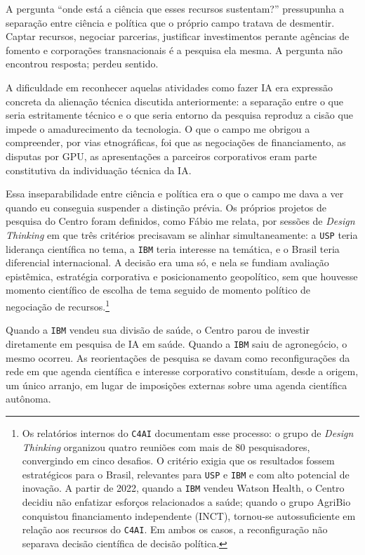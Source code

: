 A pergunta \enquote{onde está a ciência que esses recursos sustentam?} pressupunha a separação entre ciência e política que o próprio campo tratava de desmentir. Captar recursos, negociar parcerias, justificar investimentos perante agências de fomento e corporações transnacionais é a pesquisa ela mesma. A pergunta não encontrou resposta; perdeu sentido.

A dificuldade em reconhecer aquelas atividades como fazer IA era expressão concreta da alienação técnica discutida anteriormente: a separação entre o que seria estritamente técnico e o que seria entorno da pesquisa reproduz a cisão que impede o amadurecimento da tecnologia. O que o campo me obrigou a compreender, por vias etnográficas, foi que as negociações de financiamento, as disputas por GPU, as apresentações a parceiros corporativos eram parte constitutiva da individuação técnica da IA.

Essa inseparabilidade entre ciência e política era o que o campo me dava a ver quando eu conseguia suspender a distinção prévia. Os próprios projetos de pesquisa do Centro foram definidos, como Fábio me relata, por sessões de \textit{Design Thinking} em que três critérios precisavam se alinhar simultaneamente: a \texttt{USP} teria liderança científica no tema, a \texttt{IBM} teria interesse na temática, e o Brasil teria diferencial internacional. A decisão era uma só, e nela se fundiam avaliação epistêmica, estratégia corporativa e posicionamento geopolítico, sem que houvesse momento científico de escolha de tema seguido de momento político de negociação de recursos.\footnote{Os relatórios internos do \texttt{C4AI} documentam esse processo: o grupo de \textit{Design Thinking} organizou quatro reuniões com mais de 80 pesquisadores, convergindo em cinco desafios. O critério exigia que os resultados fossem estratégicos para o Brasil, relevantes para \texttt{USP} e \texttt{IBM} e com alto potencial de inovação. A partir de 2022, quando a \texttt{IBM} vendeu Watson Health, o Centro decidiu não enfatizar esforços relacionados a saúde; quando o grupo AgriBio conquistou financiamento independente (INCT), tornou-se autossuficiente em relação aos recursos do \texttt{C4AI}. Em ambos os casos, a reconfiguração não separava decisão científica de decisão política.}

Quando a \texttt{IBM} vendeu sua divisão de saúde, o Centro parou de investir diretamente em pesquisa de IA em saúde. Quando a \texttt{IBM} saiu de agronegócio, o mesmo ocorreu. As reorientações de pesquisa se davam como reconfigurações da rede em que agenda científica e interesse corporativo constituíam, desde a origem, um único arranjo, em lugar de imposições externas sobre uma agenda científica autônoma.

